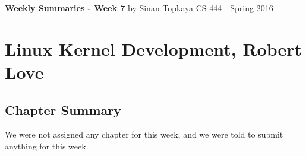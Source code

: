 \documentclass[letterpaper,10pt,draftclsnofoot,onecolumn]{IEEEtran}
\begin{document}
\begin{titlepage}
	
	\begin{center}
	\bigbreak
	\textbf{Weekly Summaries - Week 7}
	\bigbreak
	by Sinan Topkaya
	\smallbreak
	CS 444 - Spring 2016
	\end{center}
\end{titlepage}
	
\section*{Linux Kernel Development, Robert Love}
\subsection*{Chapter Summary}

We were not assigned any chapter for this week, and we were told to submit anything for this week.
\end{document}
